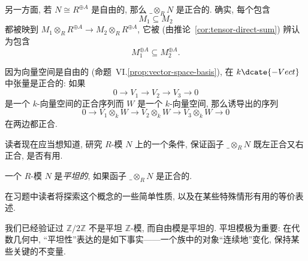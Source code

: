另一方面, 若 $N\cong R^{\oplus A}$ 是自由的, 那么 $\_\otimes_R N$ 是正合的. 确实, 每个包含
\[
M_1\subseteq M_2
\]
都被映到 $M_1\otimes_R R^{\oplus A}\to M_2\otimes_R R^{\oplus A}$, 它被 (由推论~\ref{cor:tensor-direct-sum}) 辨认为包含
\[
M_1^{\oplus A}\subseteq M_2^{\oplus A}.
\]

\begin{example}\label{ex:tensor-flat-kvect}
因为向量空间是自由的 (命题~VI.\ref{prop:vector-space-basis}), 在 $k\dcate{-Vect}$ 中张量是正合的: 如果
\[
0\longrightarrow V_1\longrightarrow V_2\longrightarrow V_3\longrightarrow 0
\]
是一个 $k$-向量空间的正合序列而 $W$ 是一个 $k$-向量空间, 那么诱导出的序列
\[
0\longrightarrow V_1\otimes_k W\longrightarrow V_2\otimes_k W\longrightarrow V_3\otimes_k W\longrightarrow 0
\]
在两边都正合.
\end{example}

读者现在应当想知道, 研究 $R$-模 $N$ 上的一个条件, 保证函子 $\_\otimes_R N$ 既左正合又右正合, 是否有用.

\begin{definition}\label{def:flat-module}
一个 $R$-模 $N$ 是\emph{平坦的}, 如果函子 $\_\otimes_R N$ 是正合的.
\end{definition}

在习题中读者将探索这个概念的一些简单性质, 以及在某些特殊情形有用的等价表述.

我们已经验证过 $\mathbb{Z}/2\mathbb{Z}$ 不是平坦 $\mathbb{Z}$-模, 而自由模是平坦的. 平坦模极为重要: 在代数几何中, ``平坦性''表达的是如下事实——一个族中的对象``连续地''变化, 保持某些关键的不变量.

